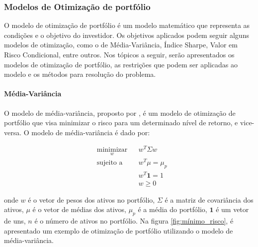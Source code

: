             \subsubsection{Modelos de Otimização de portfólio}

                \ipar O modelo de otimização de portfólio é um modelo matemático que representa as condições e o objetivo do investidor. Os objetivos aplicados podem seguir alguns modelos de otimização, como o de Média-Variância, Índice Sharpe, Valor em Risco Condicional, entre outros. Nos tópicos a seguir, serão apresentados os modelos de otimização de portfólio, as restrições que podem ser aplicadas ao modelo e os métodos para resolução do problema.

                \paragraph{Média-Variância}

                    \ipar O modelo de média-variância, proposto por \cite{markowitz1952portfolio}, é um modelo de otimização de portfólio que visa minimizar o risco para um determinado nível de retorno, e vice-versa. O modelo de média-variância é dado por:

                    \begin{equation}
                        \label{eq:markowitz}
                        \begin{aligned}
                            & \underset{w}{\text{minimizar}}
                            & & w^T \Sigma w \\
                            & \text{sujeito a}
                            & & w^T \mu = \mu_p \\
                            & & & w^T \mathbf{1} = 1 \\
                            & & & w \geq 0
                        \end{aligned}
                    \end{equation}

                    \noindent onde $w$ é o vetor de pesos dos ativos no portfólio, $\Sigma$ é a matriz de covariância dos ativos, $\mu$ é o vetor de médias dos ativos, $\mu_p$ é a média do portfólio, $\mathbf{1}$ é um vetor de uns, $n$ é o número de ativos no portfólio. Na figura \ref{fig:mínimo_risco}, é apresentado um exemplo de otimização de portfólio utilizando o modelo de média-variância.

